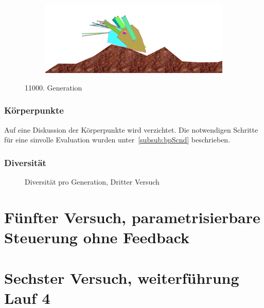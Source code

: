 \begin{figure}[H]
\begin{subfigure}[b]{0.45\textwidth}
              \caption{\label{fig:gen11000_3}}
            \end{subfigure}
            \begin{subfigure}[b]{0.45\textwidth}
              \includegraphics[width=\linewidth,center]{graphics/simulation-results/4_gen11000_4}
              \caption{\label{fig:gen11000_4}}
            \end{subfigure}
            \caption{11000. Generation \label{fig:gen11000}}
          \end{figure}

          \subsubsection{Körperpunkte}

            Auf eine Diskussion der Körperpunkte wird verzichtet.
            Die notwendigen Schritte für eine sinvolle Evaluation wurden unter~\vref{subsub:bpScnd} beschrieben.

          \subsubsection{Diversität}

            \begin{figure}
              \centering
              
              \caption{Diversität pro Generation, Dritter Versuch\label{fig:graphDivFourth}}
            \end{figure}

    \section{Fünfter Versuch, parametrisierbare Steuerung ohne Feedback}

    \section{Sechster Versuch, weiterführung Lauf 4 \label{sec:sixthSimulation}}
